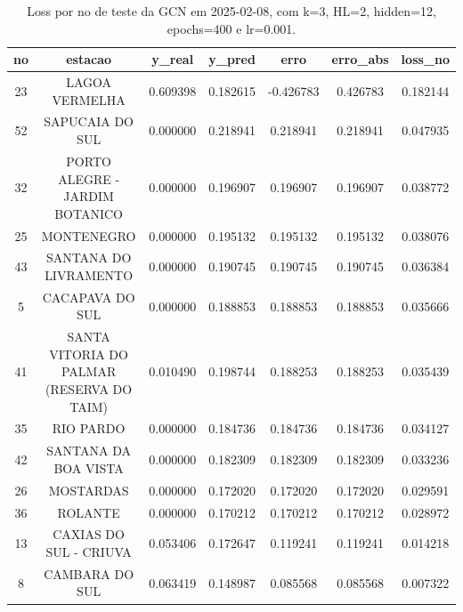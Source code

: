 \begin{table}[h]
\centering
\caption{Loss por no de teste da GCN em 2025-02-08, com k=3, HL=2, hidden=12, epochs=400 e lr=0.001.}
\label{tab:gcn_loss_k3_hl2_h12_e400_d20250208}
\begin{tabular}{ccccccc}
\toprule
no & estacao & y\_real & y\_pred & erro & erro\_abs & loss\_no \\
\midrule
23 & LAGOA VERMELHA & 0.609398 & 0.182615 & -0.426783 & 0.426783 & 0.182144 \\
52 & SAPUCAIA DO SUL & 0.000000 & 0.218941 & 0.218941 & 0.218941 & 0.047935 \\
32 & PORTO ALEGRE - JARDIM BOTANICO & 0.000000 & 0.196907 & 0.196907 & 0.196907 & 0.038772 \\
25 & MONTENEGRO & 0.000000 & 0.195132 & 0.195132 & 0.195132 & 0.038076 \\
43 & SANTANA DO LIVRAMENTO & 0.000000 & 0.190745 & 0.190745 & 0.190745 & 0.036384 \\
5 & CACAPAVA DO SUL & 0.000000 & 0.188853 & 0.188853 & 0.188853 & 0.035666 \\
41 & SANTA VITORIA DO PALMAR (RESERVA DO TAIM) & 0.010490 & 0.198744 & 0.188253 & 0.188253 & 0.035439 \\
35 & RIO PARDO & 0.000000 & 0.184736 & 0.184736 & 0.184736 & 0.034127 \\
42 & SANTANA DA BOA VISTA & 0.000000 & 0.182309 & 0.182309 & 0.182309 & 0.033236 \\
26 & MOSTARDAS & 0.000000 & 0.172020 & 0.172020 & 0.172020 & 0.029591 \\
36 & ROLANTE & 0.000000 & 0.170212 & 0.170212 & 0.170212 & 0.028972 \\
13 & CAXIAS DO SUL - CRIUVA & 0.053406 & 0.172647 & 0.119241 & 0.119241 & 0.014218 \\
8 & CAMBARA DO SUL & 0.063419 & 0.148987 & 0.085568 & 0.085568 & 0.007322 \\
\bottomrule
\end{tabular}
\end{table}
